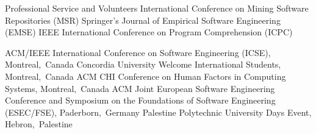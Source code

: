 

\begin{rubric}{Professional Service and Volunteers}
    \entry*[2019] International Conference on Mining Software Repositories (MSR)
    \entry*[2018] Springer’s Journal of Empirical Software Engineering (EMSE)
    \entry*[2017] IEEE International Conference on Program Comprehension (ICPC)


    \entry*[2019] ACM/IEEE International Conference on Software Engineering (ICSE), Montreal,~Canada
    \entry*[2018] Concordia University Welcome International Students, Montreal,~Canada
    \entry*[2018] ACM CHI Conference on Human Factors in Computing Systems, Montreal,~Canada
    \entry*[2017] ACM Joint European Software Engineering Conference  and Symposium on the Foundations of Software Engineering (ESEC/FSE), Paderborn,~Germany
    \entry*[2015] Palestine Polytechnic University Days Event, Hebron,~Palestine

\end{rubric}
